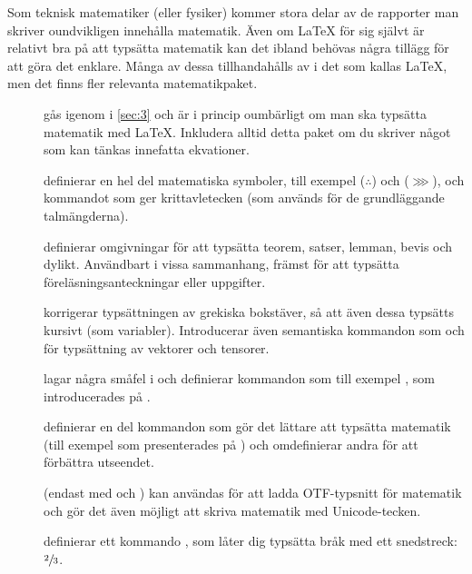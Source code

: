 \documentclass[lang=sv,ptsize=10pt,font=none,nomath,titles=bf,../../a4.tex]{subfiles}
\begin{document}
Som teknisk matematiker (eller fysiker) kommer stora delar av de rapporter
man skriver oundvikligen innehålla matematik. Även om \LaTeX{} för sig
självt är relativt bra på att typsätta matematik kan det ibland behövas
några tillägg för att göra det enklare. Många av dessa tillhandahålls av
\AmS{} i det som kallas \AmS\LaTeX, men det finns fler relevanta
matematikpaket.

\begin{description}
	\item[]
	gås igenom i \cref{sec:3} och är i princip oumbärligt om man ska
	typsätta matematik med \LaTeX. Inkludera alltid detta paket om du
	skriver något som kan tänkas innefatta ekvationer.

	\item[]
	definierar en hel del matematiska symboler, till exempel 
	 (\(\therefore\)) och  (\(\ggg\)), och 
	kommandot  som ger krittavletecken (som
	används för de grundläggande talmängderna).
	
	\item[]
	definierar omgivningar för att typsätta teorem, satser, lemman, bevis
	och dylikt. Användbart i vissa sammanhang, främst för att typsätta
	föreläsningsanteckningar eller uppgifter. 
	
	\item[{}]
	korrigerar typsättningen av grekiska bokstäver, så att även dessa typsätts
	kursivt (som variabler). Introducerar även semantiska kommandon som
	 och  för typsättning av vektorer
	och tensorer.
	
	\item[]
	lagar några småfel i  och definierar kommandon som till
	exempel , som introducerades på
	.

	\item[]
	definierar en del kommandon som gör det lättare att typsätta matematik
	(till exempel  som presenterades på )
	och omdefinierar andra för att förbättra utseendet.

	\item[{}]
		(endast med \XeTeX och )
	kan användas för att ladda \textsc{OTF}-typsnitt för matematik och
	gör det även möjligt att skriva matematik med Unicode-tecken.

	\item[{}]
	definierar ett kommando , som låter dig typsätta bråk
	med ett snedstreck: \(\sfrac{2}{3}\).
\end{description}
\end{document}
